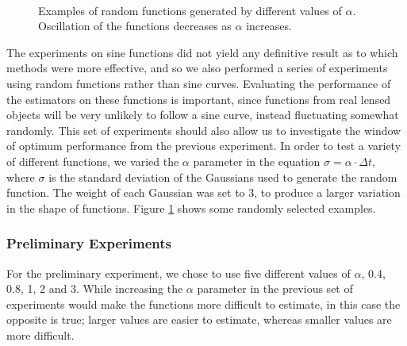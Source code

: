 \documentclass[a4paper,11pt]{article}
\begin{document}
\begin{figure}
{   }\\
   \begin{center}
   \end{center}
   \caption{Examples of random functions generated by different
   values of $\alpha$. Oscillation of the functions decreases as $\alpha$ increases.}
   \label{fig:randex}
   \end{figure}
   The experiments on sine functions did not yield any definitive result as to
   which methods were more effective, and so we also performed a series of
   experiments using random functions rather than sine curves. Evaluating the
   performance of the estimators on these functions is important, since
   functions from real lensed objects will be very unlikely to follow a sine
   curve, instead fluctuating somewhat randomly. This set of experiments should
   also allow us to investigate the window of optimum performance from the
   previous experiment. In order to test a variety of different functions, we
   varied the $\alpha$ parameter in the equation $\sigma=\alpha\cdot\Delta t$,
   where $\sigma$ is the standard deviation of the Gaussians used to generate
   the random function. The weight of each Gaussian was set to 3, to produce a
   larger variation in the shape of functions. Figure \ref{fig:randex} shows
   some randomly selected examples.
\subsubsection{Preliminary Experiments}
\label{sec-8-2-1}

    For the preliminary experiment, we chose to use five different values of
    $\alpha$, 0.4, 0.8, 1, 2 and 3. While increasing the $\alpha$ parameter in the
    previous set of experiments would make the functions more difficult to estimate,
    in this case the opposite is true; larger values are easier to estimate, whereas
    smaller values are more difficult.
    
\end{document}
